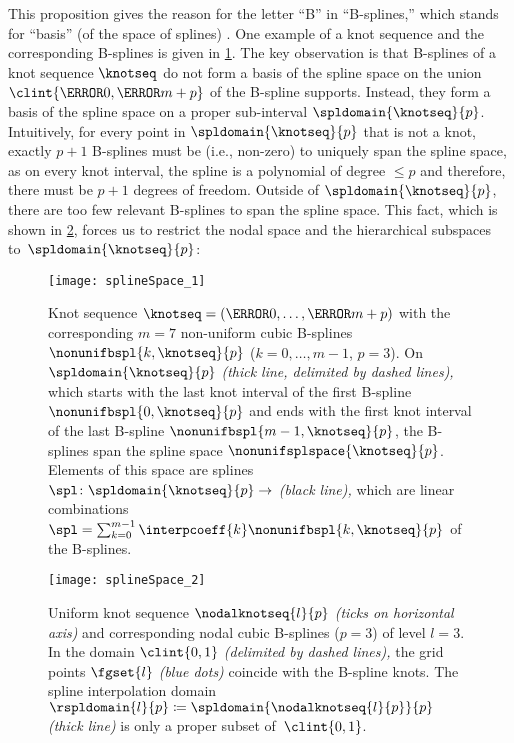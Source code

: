 This proposition gives the reason for the letter ``B'' in ``B-splines,''
which stands for ``basis'' (of the space of splines) \cite{Schoenberg67Spline}.
One example of a knot sequence and the corresponding B-splines is
given in \cref{fig:splineSpaceGeneral}.
The key observation is that B-splines of a knot sequence $\knotseq$
do not form a basis of the spline space on the union
$\clint{\knot{0}, \knot{m+p}}$ of the B-spline supports.
Instead, they form a basis of the spline space
on a proper sub-interval $\spldomain{\knotseq}{p}$.
Intuitively, for every point in $\spldomain{\knotseq}{p}$ that is not a knot,
exactly $p + 1$ B-splines must be  (i.e., non-zero)
to uniquely span the spline space,
as on every knot interval, the spline is a polynomial of degree $\le p$
and therefore, there must be $p + 1$ degrees of freedom.
Outside of $\spldomain{\knotseq}{p}$, there are too few relevant B-splines
to span the spline space.
This fact,
which is shown in \cref{fig:splineSpaceUniform},
forces us to restrict the nodal space and the hierarchical subspaces
to~$\spldomain{\knotseq}{p}$:

\begin{figure}
  \texttt{[image: splineSpace\_1]}%
  \caption[%
    Non-uniform B-splines with knot sequence and interpolation domain%
  ]{%
    Knot sequence $\knotseq = (\knot{0}, \dotsc, \knot{m+p})$
    with the corresponding $m = 7$ non-uniform cubic B-splines
    $\nonunifbspl{k,\knotseq}{p}$ ($k = 0, \dotsc, m - 1$, $p = 3$).
    On $\spldomain{\knotseq}{p}$ \emph{(thick line, delimited by dashed lines),}
    which starts with the last knot interval of the first B-spline
    $\nonunifbspl{0,\knotseq}{p}$
    and ends with the first knot interval of the last B-spline
    $\nonunifbspl{m-1,\knotseq}{p}$,
    the B-splines span the spline space $\nonunifsplspace{\knotseq}{p}$.
    Elements of this space are splines $\spl\colon \spldomain{\knotseq}{p} \to \real$
    \emph{(black line),}
    which are linear combinations
    $\spl = \sum_{k=0}^{m-1} \interpcoeff{k} \nonunifbspl{k,\knotseq}{p}$
    of the B-splines.%
  }%
  \label{fig:splineSpaceGeneral}%
\end{figure}

\begin{figure}
  \texttt{[image: splineSpace\_2]}%
  \caption[%
    Uniform nodal B-splines and knot sequence%
  ]{%
    Uniform knot sequence $\nodalknotseq{l}{p}$ \emph{(ticks on horizontal axis)}
    and corresponding nodal cubic B-splines ($p = 3$) of level $l = 3$.
    In the domain $\clint{0, 1}$ \emph{(delimited by dashed lines),}
    the grid points $\fgset{l}$ \emph{\textcolor{mittelblau}{(blue dots)}}
    coincide with the B-spline knots.
    The spline interpolation domain
    $\rspldomain{l}{p} \ceq \spldomain{\nodalknotseq{l}{p}}{p}$
    \emph{(thick line)}
    is only a proper subset of~$\clint{0, 1}$.%
  }%
  \label{fig:splineSpaceUniform}%
\end{figure}


